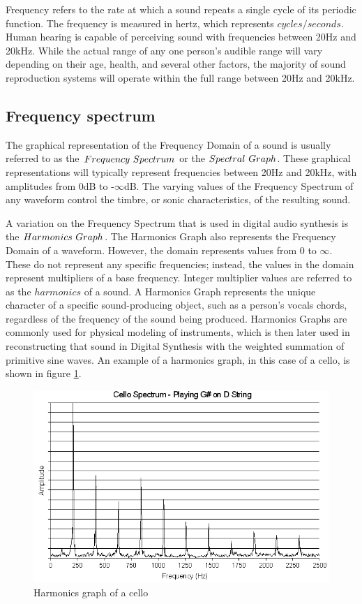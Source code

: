 \documentclass[a4paper,12pt]{report}
\begin{document}
Frequency refers to the rate at which a sound repeats a single cycle of its periodic function. The frequency is measured in hertz, which represents $cycles/seconds$. Human hearing is capable of perceiving sound with frequencies between 20Hz and 20kHz. While the actual range of any one person's audible range will vary depending on their age, health, and several other factors, the majority of sound reproduction systems will operate within the full range between 20Hz and 20kHz. 

\subsection{Frequency spectrum}
\label{subsec:freqspect}
The graphical representation of the Frequency Domain of a sound is usually referred to as the $Frequency\ \-Spectrum$ or the $Spectral\ \-Graph$. These graphical representations will typically represent frequencies between 20Hz and 20kHz, with amplitudes from 0dB to -$\infty$dB. The varying values of the Frequency Spectrum of any waveform control the timbre, or sonic characteristics, of the resulting sound.

A variation on the Frequency Spectrum that is used in digital audio synthesis is the $Harmonics\ \-Graph$. The Harmonics Graph also represents the Frequency Domain of a waveform. However, the domain represents values from 0 to $\infty$. These do not represent any specific frequencies; instead, the values in the domain represent multipliers of a base frequency. Integer multiplier values are referred to as the $harmonics$ of a sound. A Harmonics Graph represents the unique character of a specific sound-producing object, such as a person's vocals chords, regardless of the frequency of the sound being produced. Harmonics Graphs are commonly used for physical modeling of instruments, which is then later used in reconstructing that sound in Digital Synthesis with the weighted summation of primitive sine waves. An example of a harmonics graph, in this case of a cello, is shown in figure \ref{fig:CelloHarmonicsGraph}.

\begin{figure}[h]
    \centering
    \includegraphics[width=36em]{CelloHarmonicsGraph.png}
    \caption{Harmonics graph of a cello}
    \label{fig:CelloHarmonicsGraph}
\end{figure}
\end{document}

